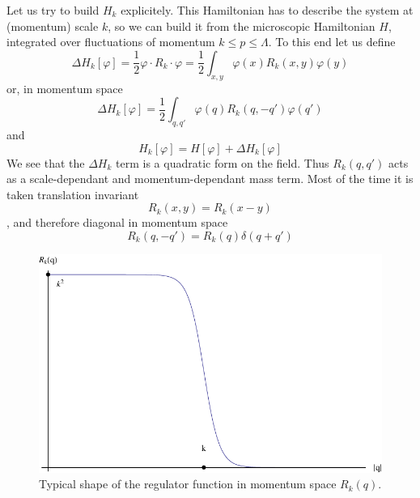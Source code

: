 Let us try to build $H_k$ explicitely. This Hamiltonian has to describe the system at (momentum) scale $k$, so we can build it from the microscopic Hamiltonian $H$, integrated over fluctuations of momentum $k \leq p \leq \Lambda$. To this end let us define 
\begin{equation}
\Delta H_k[\varphi] = \frac{1}{2} \varphi \cdot R_k \cdot \varphi = \frac{1}{2} \int_{x,y} \varphi(x) R_k(x,y) \varphi(y)
\end{equation}
or, in momentum space
\begin{equation}
\Delta H_k[\varphi] = \frac{1}{2} \int_{q,q'} \varphi(q) R_k(q,-q') \varphi(q')
\end{equation}
and
\begin{equation}
H_k[\varphi] = H[\varphi] + \Delta H_k[\varphi]
\end{equation}
We see that the $\Delta H_k$ term is a quadratic form on the field. Thus $R_k(q,q')$ acts as a scale-dependant and momentum-dependant mass term. Most of the time it is taken translation invariant
\begin{equation}
R_k(x,y) = R_k(x-y)
\end{equation}
, and therefore diagonal in momentum space
\begin{equation}
R_k(q,-q') = R_k(q) \delta(q+q')
\end{equation}

\begin{figure}[htp]
\begin{center}
\includegraphics[scale=1]{img/chap2/regulator.pdf}
\caption{Typical shape of the regulator function in momentum space $R_k(q)$.}
\label{fig:regulator}
\end{center}
\end{figure}


